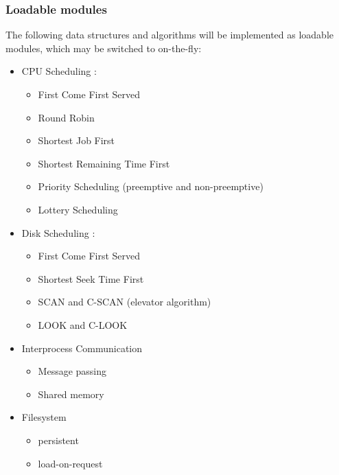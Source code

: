 \documentclass[10pt,a4paper]{article}
\begin{document}
\subsubsection{Loadable modules}
The following data structures and algorithms will be implemented as loadable
modules, which may be switched to on-the-fly:
\begin{itemize}
    \item CPU Scheduling \cite{DinosaurCPU}:
        \begin{itemize}
            \item First Come First Served
            \item Round Robin
            \item Shortest Job First
            \item Shortest Remaining Time First
            \item Priority Scheduling (preemptive and non-preemptive)
            \item Lottery Scheduling
        \end{itemize}
    \item Disk Scheduling \cite{DinosaurDisk}:
        \begin{itemize}
            \item First Come First Served
            \item Shortest Seek Time First
            \item SCAN and C-SCAN (elevator algorithm)
            \item LOOK and C-LOOK
        \end{itemize}
    \item Interprocess Communication
        \begin{itemize}
            \item Message passing
            \item Shared memory
        \end{itemize}
    \item Filesystem
        \begin{itemize}
            \item persistent
            \item load-on-request
        \end{itemize}
\end{itemize}
\end{document}
